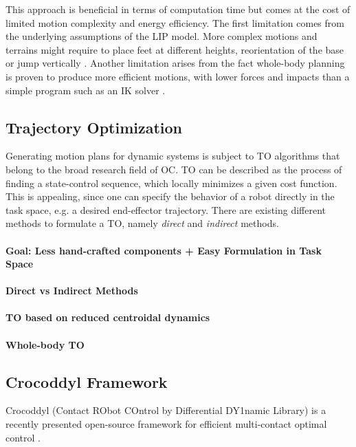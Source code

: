 This approach is beneficial in terms of computation time but comes at the cost of limited motion complexity and energy efficiency. 
The first limitation comes from the underlying assumptions of the \gls{LIP} model. More complex motions and terrains might require to place feet at different heights, reorientation of the base or jump vertically \cite{winkler2018optimization}. Another limitation arises from the fact whole-body planning  is proven to produce more efficient motions, with lower forces and impacts than a simple program such as an \gls{IK} solver \cite{budhiraja2018differential}.   

\subsection{Trajectory Optimization}
Generating motion plans for dynamic systems is subject to \gls{TO} algorithms that belong to the broad research field of \gls{OC}. \gls{TO} can be described as the process of finding a state-control sequence, which locally minimizes a given cost function. This is appealing, since one can specify the behavior of a robot directly in the task space, e.g. a desired end-effector trajectory. There are existing different methods to formulate a \gls{TO}, namely \textit{direct} and \textit{indirect} methods. 
\paragraph{Goal: Less hand-crafted components + Easy Formulation in Task Space}
\paragraph{Direct vs Indirect Methods}
\paragraph{TO based on reduced centroidal dynamics}
\paragraph{Whole-body TO}
\subsection{Crocoddyl Framework} 
Crocoddyl (Contact RObot COntrol by Differential DY1namic Library) is a recently presented open-source framework for efficient multi-contact optimal control \cite{mastalli20crocoddyl}. 


